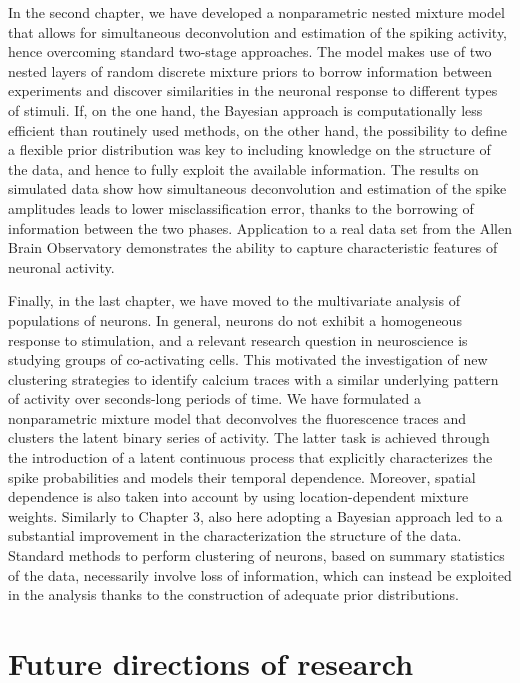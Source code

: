 In the second chapter, we have developed a nonparametric nested mixture model that allows for simultaneous deconvolution and estimation of the spiking activity, hence overcoming standard two-stage approaches.
The model makes use of two nested layers of random discrete mixture priors to borrow information between experiments and discover similarities in the neuronal response to different types of stimuli. 
If, on the one hand, the Bayesian approach is computationally less efficient than routinely used methods, on the other hand, the possibility to define a flexible prior distribution was key to including knowledge on the structure of the data, and hence to fully exploit the available information. 
The results on simulated data show how simultaneous deconvolution and estimation of the spike amplitudes leads to lower misclassification error, thanks to the borrowing of information between the two phases. Application to a real data set from the Allen Brain Observatory demonstrates the ability to capture characteristic features of neuronal activity.

Finally, in the last chapter, we have moved to the multivariate analysis of populations of neurons. In general, neurons do not exhibit a homogeneous response to stimulation, and a relevant research question in neuroscience is studying groups of co-activating cells.
This motivated the investigation of new clustering strategies to identify calcium traces with a similar underlying pattern of activity over seconds-long periods of time.
We have formulated a nonparametric mixture model that deconvolves the fluorescence traces and clusters the latent binary series of activity. The latter task is achieved through the introduction of a latent continuous process that explicitly characterizes the spike probabilities and models their temporal dependence. Moreover, spatial dependence is also taken into account by using location-dependent mixture weights. Similarly to Chapter 3, also here adopting a Bayesian approach led to a substantial improvement in the characterization the structure of the data. Standard methods to perform clustering of neurons, based on summary statistics of the data, necessarily involve loss of information, which can instead be exploited in the analysis thanks to the construction of adequate prior distributions.

\section*{Future directions of research}

